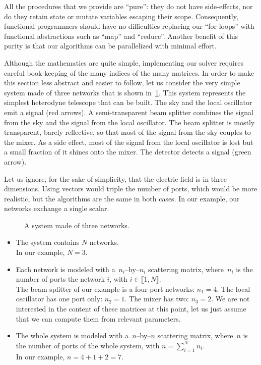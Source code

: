 All the procedures that we provide are ``pure'': they do not have side-effects, nor do they retain state or mutate variables escaping their scope.
Consequently, functional programmers should have no difficulties replacing our ``for loops'' with functional abstractions such as ``map'' and ``reduce''.
Another benefit of this purity is that our algorithms can be parallelized with minimal effort.

Although the mathematics are quite simple, implementing our solver requires careful book-keeping of the many indices of the many matrices.
In order to make this section less abstract and easier to follow, let us consider the very simple system made of three networks that is shown in~\cref{fig:implementation_0}.
This system represents the simplest heterodyne telescope that can be built.
The sky and the local oscillator emit a signal (red arrows).
A semi-transparent beam splitter combines the signal from the sky and the signal from the local oscillator.
The beam splitter is mostly transparent, barely reflective, so that most of the signal from the sky couples to the mixer.
As a side effect, most of the signal from the local oscillator is lost but a small fraction of it shines onto the mixer.
The detector detects a signal (green arrow).

Let us ignore, for the sake of simplicity, that the electric field is in three dimensions.
Using vectors would triple the number of ports, which would be more realistic, but the algorithms are the same in both cases.
In our example, our networks exchange a single scalar.

\begin{figure}
    \centering
    
    \caption{A system made of three networks.}
    \label{fig:implementation_0}
\end{figure}

\begin{itemize}
    \item 
The system contains $N$ networks.
\\In our example, $N=3$.
    \item 
Each network is modeled with a~$n_i$--by--$n_i$ scattering matrix, where~$n_i$ is the number of ports the network $i$, with $i \in \llbracket 1, N \rrbracket$.
\\
The beam splitter of our example is a four-port networks: $n_1=4$.
The local oscillator has one port only: $n_2=1$.
The mixer has two: $n_3=2$.
We are not interested in the content of these matrices at this point, let us just assume that we can compute them from relevant parameters.
    \item 
The whole system is modeled with a~$n$--by--$n$ scattering matrix, where~$n$ is the number of ports of the whole system, with $n = \sum_{i=1}^N n_i$.
\\
In our example, $n=4+1+2=7$.
\end{itemize}

